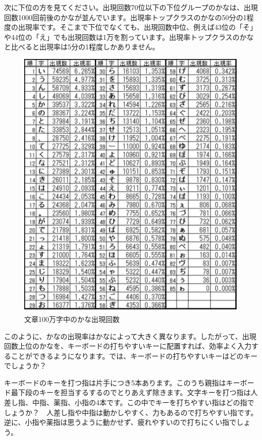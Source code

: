 次に下位の方を見てください。出現回数70位以下の下位グループのかなは、出現回数1000回前後のかなが並んでいます。出現率トップクラスのかなの50分の1程度の出現率です。そこまで下位でなくても、出現回数中位、例えば43位の「そ」や44位の「え」でも出現回数は1万を割っています。出現率トップクラスのかなと比べると出現率は5分の1程度しかありません。

\begin{figure}
 \begin{center}
   \includegraphics[width=14cm,clip]{res_kouy/1gram.eps}
 \end{center}
 \caption{文章100万字中のかな出現回数}
 \label{1gram}
\end{figure}

このように、かなの出現率はかなによって大きく異なります。したがって、出現回数上位のかなを、キーボードの打ちやすいキーに配置すれば、効率よく入力することができるようになります。では、キーボードの打ちやすいキーはどのキーでしょうか？

キーボードのキーを打つ指は片手につき5本あります。このうち親指はキーボード最下段のキーを担当するするのでとりあえず除きます。文字キーを打つ指は人差し指、中指、薬指、小指の4本です。この中でキーを打ちやすい指はどの指でしょうか？　人差し指や中指は動かしやすく、力もあるので打ちやすい指です。逆に、小指や薬指は思うように動かせず、疲れやすいので打ちにくい指でしょう。

